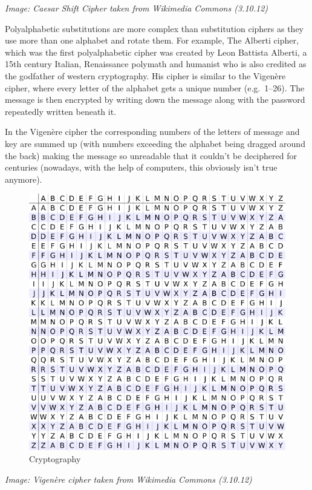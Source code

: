 \emph{Image: Caesar Shift Cipher taken from Wikimedia Commons (3.10.12)}

Polyalphabetic substitutions are more complex than substitution ciphers
as they use more than one alphabet and rotate them. For example, The
Alberti cipher, which was the first polyalphabetic cipher was created by
Leon Battista Alberti, a 15th century Italian, Renaissance polymath and
humanist who is also credited as the godfather of western cryptography.
His cipher is similar to the Vigenère cipher, where every letter of the
alphabet gets a unique number (e.g.~1--26). The message is then
encrypted by writing down the message along with the password repeatedly
written beneath it.

In the Vigenère cipher the corresponding numbers of the letters of
message and key are summed up (with numbers exceeding the alphabet being
dragged around the back) making the message so unreadable that it
couldn't be deciphered for centuries (nowadays, with the help of
computers, this obviously isn't true anymore).

\begin{figure}[htbp]
\centering
\includegraphics{crypto_3.png}
\caption{Cryptography}
\end{figure}

\emph{Image: Vigenère cipher taken from Wikimedia Commons (3.10.12)}

